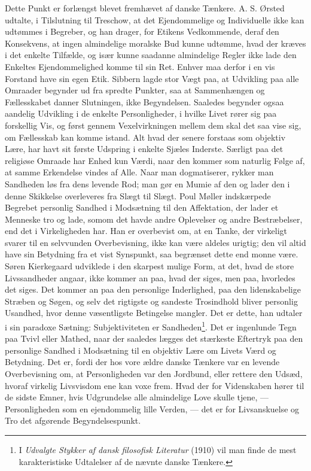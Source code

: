 \documentclass[12pt,a4paper]{article}
\newcommand{\opage}[1]{\marginnote{\footnotesize\textit{[#1]}}}
\begin{document}
Dette Punkt er forlængst blevet fremhævet af danske Tænkere. A. S. Ørsted
udtalte, i Tilslutning til Treschow, at det Ejendommelige og Individuelle ikke
kan udtømmes i Begreber, og han drager, for Etikens Vedkommende, deraf den
Konsekvens, at ingen almindelige moralske Bud kunne udtømme, hvad der kræves i
det enkelte Tilfælde, og især kunne saadanne almindelige Regler ikke lade den
Enkeltes Ejendommelighed komme til sin Ret. Enhver maa derfor i en vis Forstand
have sin egen Etik. Sibbern lagde stor Vægt paa, at Udvikling paa alle Omraader
begynder ud fra spredte Punkter, saa at Sammenhængen og Fællesskabet danner
Slutningen, ikke Begyndelsen. Saaledes begynder ogsaa aandelig Udvikling i de
enkelte Personligheder, i hvilke Livet rører sig paa forskellig Vis, og først
gennem Vexelvirkningen mellem dem skal det saa vise sig, om Fællesskab kan komme
istand. Alt hvad der senere forstaas som objektiv Lære, har havt sit første
Udspring i enkelte Sjæles Inderste. Særligt paa det religiøse Omraade har Enhed
kun Værdi, naar den kommer som naturlig Følge af, at samme Erkendelse vindes af
Alle. Naar man dogmatiserer, rykker \opage{49} man Sandheden løs fra dens levende Rod; man
gør en Mumie af den og lader den i denne Skikkelse overleveres fra Slægt til
Slægt. Poul Møller indskærpede Begrebet personlig Sandhed i Modsætning til den
Affektation, der lader et Menneske tro og lade, somom det havde andre Oplevelser
og andre Bestræbelser, end det i Virkeligheden har. Han er overbevist om, at en
Tanke, der virkeligt svarer til en selvvunden Overbevisning, ikke kan være
aldeles urigtig; den vil altid have sin Betydning fra et vist Synspunkt, saa
begrænset dette end monne være. Søren Kierkegaard udviklede i den skarpest
mulige Form, at det, hvad de store Livssandheder angaar, ikke kommer an paa,
hvad der siges, men paa, hvorledes det siges. Det kommer an paa den personlige
Inderlighed, paa den lidenskabelige Stræben og Søgen, og selv det rigtigste og
sandeste Trosindhold bliver personlig Usandhed, hvor denne væsentligste
Betingelse mangler. Det er dette, han udtaler i sin paradoxe Sætning:
Subjektiviteten er Sandheden\footnote{I \emph{Udvalgte Stykker af dansk
filosofisk Literatur} (1910) vil man finde de mest karakteristiske Udtalelser af
de nævnte danske Tænkere.}. Det er ingenlunde Tegn paa Tvivl eller Mathed, naar
der saaledes lægges det stærkeste Eftertryk paa den personlige Sandhed i
Modsætning til en objektiv Lære om Livets Værd og Betydning. Det er, fordi der
hos vore ældre danske Tænkere var en levende Overbevisning om, at Personligheden
var den Jordbund, eller rettere den Udsæd, hvoraf virkelig Livsvisdom ene kan
voxe frem. Hvad der for Videnskaben hører til de sidste Emner, hvis Udgrundelse
alle almindelige Love skulle tjene, --- Personligheden som en ejendommelig lille
Verden, --- det er for Livsanskuelse og Tro det afgørende Begyndelsespunkt.
\end{document}
